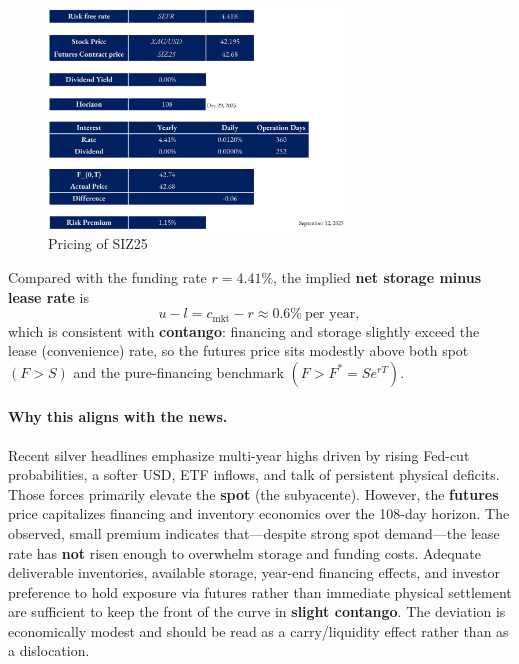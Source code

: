\documentclass[10pt,a4paper]{article} %
\begin{document}
\begin{figure}[h]
\centering
\includegraphics[width=0.7\textwidth]{figures/silver_pricing_one_day.png}
\caption{Pricing of SIZ25}
\end{figure}

Compared with the funding rate $r=4.41\%$, the implied \textbf{net storage minus lease rate} is
\[
u-l = c_{\mathrm{mkt}} - r \approx \mathbf{0.6\%}\ \text{per year},
\]
which is consistent with \textbf{contango}: financing and storage slightly exceed the lease (convenience) rate, so the futures price sits modestly above both spot $(F>S)$ and the pure-financing benchmark $(F>F^{*}=S e^{rT})$.

\paragraph{Why this aligns with the news.} Recent silver headlines emphasize multi-year highs driven by rising Fed-cut probabilities, a softer USD, ETF inflows, and talk of persistent physical deficits. Those forces primarily elevate the \textbf{spot} (the subyacente). However, the \textbf{futures} price capitalizes financing and inventory economics over the 108-day horizon. The observed, small premium indicates that—despite strong spot demand—the lease rate has \textbf{not} risen enough to overwhelm storage and funding costs. Adequate deliverable inventories, available storage, year-end financing effects, and investor preference to hold exposure via futures rather than immediate physical settlement are sufficient to keep the front of the curve in \textbf{slight contango}. The deviation is economically modest and should be read as a carry/liquidity effect rather than as a dislocation.
\end{document}
